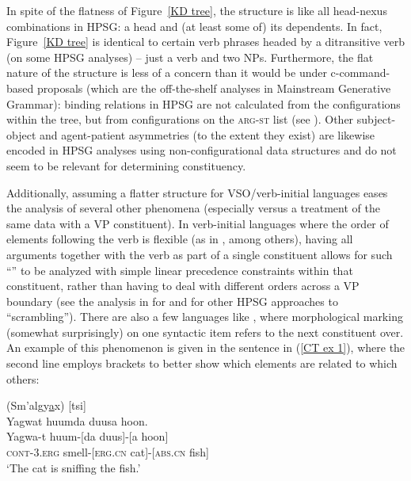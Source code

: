 \documentclass[output=paper,biblatex,babelshorthands,newtxmath,draftmode,colorlinks,citecolor=brown]{langscibook}
\begin{document}
In spite of the flatness of Figure~\ref{KD tree}, the structure is like all head-nexus combinations
in HPSG: a head and (at least some of) its dependents. In fact, Figure~\ref{KD tree} is identical to
certain verb phrases headed by a ditransitive verb (on some HPSG analyses) -- just a verb and two
NPs. Furthermore, the flat nature of the structure is less of a concern than it would be under
c-command-based proposals (which are the off-the-shelf analyses in Mainstream
Generative Grammar): binding relations in HPSG are not calculated from the configurations within the
tree, but from configurations on the \textsc{arg-st} list (see ). Other
subject-object and agent-patient asymmetries (to the extent they exist) are likewise encoded in HPSG
analyses using non-configurational data structures and do not seem to be relevant for determining
constituency.

\largerpage 
Additionally, assuming a flatter structure for VSO/verb-initial languages eases the analysis of
several other phenomena (especially versus a treatment of the same data with a VP constituent). In
verb-initial languages where the order of elements following the verb is flexible (as in
, among others), having all arguments together with the verb as part of a single
constituent allows for such ``'' to be analyzed with simple linear precedence
constraints within that constituent, rather than having to deal with different orders across a VP
boundary (see the analysis in \citealt[Chapter~3]{ball08thesis} for  and
 for other HPSG approaches to ``scrambling''). There are also a few
languages like , where morphological marking (somewhat surprisingly) on one
syntactic item refers to the next constituent over. An example of this phenomenon is given in the
 sentence in (\ref{CT ex 1}), where the second line employs brackets to better
show which elements are related to which others:

\newpage
\begin{samepage}
\begin{exe}
\ex\label{CT ex 1}  (Sm'algy\underline{a}x) [tsi] \citep[32]{mulder94} \\
 Yagwat huumda duusa hoon. \\
\gll Yagwa-t huum-[da duus]-[a hoon] \\
 \textsc{cont}-\textsc{3.erg} smell-[\textsc{erg.cn} cat]-[\textsc{abs.cn} fish] \\
\trans `The cat is sniffing the fish.' 
\end{exe}
\end{samepage}
\end{document}
